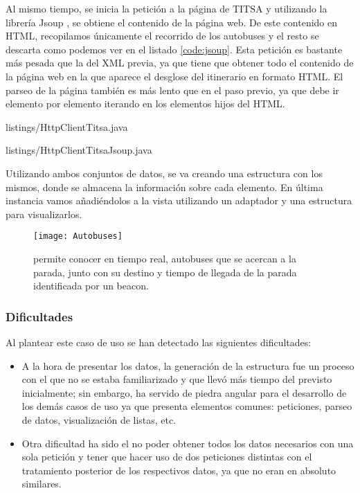 Al mismo tiempo, se inicia la petición a la página de TITSA y utilizando la librería Jsoup \cite{URL::Jsoup}, se obtiene el contenido de la página web. De este contenido en HTML, recopilamos únicamente el recorrido de los autobuses y el resto se descarta como podemos ver en el listado \ref{code:jsoup}. Esta petición es bastante más pesada que la del XML previa, ya que tiene que obtener todo el contenido de la página web en la que aparece el desglose del itinerario en formato HTML. El parseo de la página también es más lento que en el paso previo, ya que debe ir elemento por elemento iterando en los elementos hijos del HTML.


{listings/HttpClientTitsa.java} %


{listings/HttpClientTitsaJsoup.java} %

Utilizando ambos conjuntos de datos, se va creando una estructura con los mismos, donde se almacena la información sobre cada elemento. En última instancia vamos añadiéndolos a la vista utilizando un adaptador y una estructura para visualizarlos.

\begin{figure}[H]
	\centering
	\texttt{[image: Autobuses]}
	\caption{\BulletPoint{} permite conocer en tiempo real, autobuses que se acercan a la parada, junto con su destino y tiempo de llegada de la parada identificada por un beacon.}
	\label{fig:autobuses}
\end{figure}

\subsubsection{Dificultades}


Al plantear este caso de uso se han detectado las siguientes dificultades: 

\begin{itemize}
\item A la hora de presentar los datos, la generación de la estructura fue un proceso con el que no se estaba familiarizado y que llevó más tiempo del previsto inicialmente; sin embargo, ha servido de piedra angular para el desarrollo de los demás casos de uso ya que presenta elementos comunes: peticiones, parseo de datos, visualización de listas, etc.
\item Otra dificultad ha sido el no poder obtener todos los datos necesarios con una sola petición y tener que hacer uso de dos peticiones distintas con el tratamiento posterior de los respectivos datos, ya que no eran en absoluto similares.
\end{itemize}


